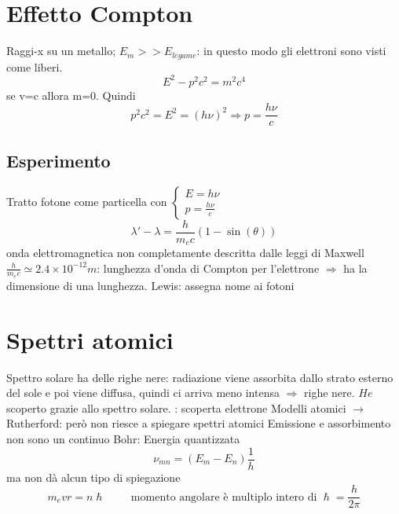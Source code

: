 \section{Effetto Compton}
Raggi-x su un metallo; $E_m >> E_{legame}$: in questo modo gli elettroni sono visti come liberi.
\begin{equation*}
    E^2 - p^2c^2 = m^2c^4
\end{equation*}
se v=c allora m=0. Quindi
\begin{equation*}
    p^2c^2 = E^2 = {(h\nu)}^2 \Rightarrow p=\frac{h\nu}{c}
\end{equation*}

\subsection*{Esperimento}
Tratto fotone come particella con 
$\begin{cases}
    E = h\nu \\
    p = \frac{h\nu}{c}
\end{cases}$
\begin{equation*}
    \lambda' - \lambda = \frac{h}{m_e c}(1 - \sin(\theta))
\end{equation*}
onda elettromagnetica non completamente descritta dalle leggi di Maxwell \newline
$\frac{h}{m_e c} \simeq 2.4 \times 10^{-12} m$: lunghezza d'onda di Compton per l'elettrone $\Rightarrow$ ha la dimensione di una lunghezza.  Lewis: assegna nome ai fotoni

\section{Spettri atomici}
Spettro solare ha delle righe nere: radiazione viene assorbita dallo strato esterno del sole e poi viene diffusa, quindi ci arriva meno intensa $\Rightarrow$ righe nere. $He$ scoperto grazie allo spettro solare. : scoperta elettrone \newline
Modelli atomici $\rightarrow$ Rutherford: però non riesce a spiegare spettri atomici \newline
Emissione e assorbimento non sono un continuo \newline
Bohr: Energia quantizzata
\begin{equation*}
    \nu_{mn} = (E_m - E_n)\frac{1}{h}
\end{equation*}
ma non dà alcun tipo di spiegazione
\begin{equation*}
    m_e v r = n \hslash \qquad \text{ momento angolare è multiplo intero di } \hslash = \frac{h}{2\pi}
\end{equation*}

